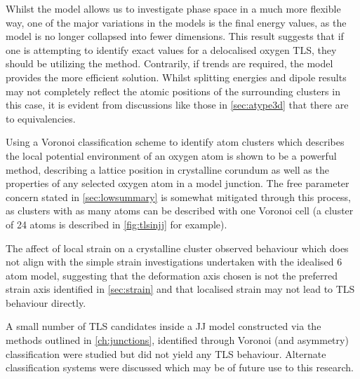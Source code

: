 Whilst the  model allows us to investigate phase space in a much more flexible way, one of the major variations in the models is the final energy values, as the  model is no longer collapsed into fewer dimensions.
This result suggests that if one is attempting to identify exact values for a delocalised oxygen TLS, they should be utilizing the  method.
Contrarily, if trends are required, the  model provides the more efficient solution.
Whilst splitting energies and dipole results may not completely reflect the atomic positions of the surrounding clusters in this case, it is evident from discussions like those in \cref{sec:atype3d} that there are  to  equivalencies.

Using a Voronoi classification scheme to identify atom clusters which describes the local potential environment of an oxygen atom is shown to be a powerful method, describing a lattice position in crystalline corundum as well as the properties of any selected oxygen atom in a model junction.
The free parameter concern stated in \cref{sec:lowsummary} is somewhat mitigated through this process, as clusters with as many atoms can be described with one Voronoi cell (a cluster of 24 atoms is described in \cref{fig:tlsinjj} for example).

The affect of local strain on a crystalline cluster observed behaviour which does not align with the simple strain investigations undertaken with the idealised 6 atom model, suggesting that the deformation axis chosen is not the preferred strain axis identified in \cref{sec:strain} and that localised strain may not lead to TLS behaviour directly.

A small number of TLS candidates inside a JJ model constructed via the methods outlined in \cref{ch:junctions}, identified through Voronoi (and asymmetry) classification were studied but did not yield any TLS behaviour.
Alternate classification systems were discussed which may be of future use to this research.
